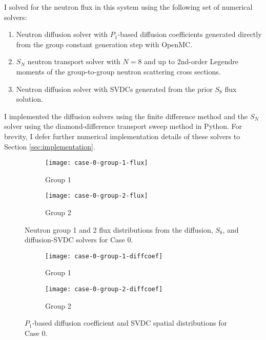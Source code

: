 I solved for the neutron flux in this system using the following set of numerical solvers:
%
\begin{enumerate}
  \item Neutron diffusion solver with $P_1$-based diffusion coefficients generated directly from
    the group constant generation step with OpenMC.
  \item $S_N$ neutron transport solver with $N=8$ and up to 2nd-order Legendre
    moments of the group-to-group neutron scattering cross sections.
  \item Neutron diffusion solver with \glspl{SVDC} generated from the prior $S_8$
    flux solution.
\end{enumerate}
%
I implemented the diffusion solvers using the finite difference method and the $S_N$
solver using the diamond-difference transport sweep method in Python. For
brevity, I defer further numerical implementation details of these solvers to Section
\ref{sec:implementation}.

\begin{figure}[htb!]
  \centering
  \begin{subfigure}[b]{.49\textwidth}
    \centering
    \texttt{[image: case-0-group-1-flux]}
    \caption{Group 1}
    \label{fig:c0g1flux}
  \end{subfigure}
  \hfill
  \begin{subfigure}[b]{.49\textwidth}
    \centering
    \texttt{[image: case-0-group-2-flux]}
    \caption{Group 2}
    \label{fig:c0g2flux}
  \end{subfigure}
  \caption{Neutron group 1 and 2 flux distributions from the diffusion, $S_8$, and
  diffusion-\gls{SVDC} solvers for Case 0.}
  \label{fig:c0flux}
\end{figure}
%
\begin{figure}[htb!]
  \centering
  \begin{subfigure}[b]{.49\textwidth}
    \centering
    \texttt{[image: case-0-group-1-diffcoef]}
    \caption{Group 1}
    \label{fig:c0g1diffcoef}
  \end{subfigure}
  \hfill
  \begin{subfigure}[b]{.49\textwidth}
    \centering
    \texttt{[image: case-0-group-2-diffcoef]}
    \caption{Group 2}
    \label{fig:c0g2diffcoef}
  \end{subfigure}
  \caption{$P_1$-based diffusion coefficient and \gls{SVDC} spatial distributions
  for Case 0.}
  \label{fig:c0diffcoef}
\end{figure}

